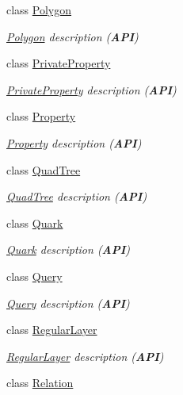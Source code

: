 \begin{DoxyCompactItemize}
class \hyperlink{classHurricane_1_1Polygon}{Polygon}
\begin{DoxyCompactList}\small\item\em \hyperlink{classHurricane_1_1Polygon}{Polygon} description ({\bfseries A\+PI}) \end{DoxyCompactList}\item 
class \hyperlink{classHurricane_1_1PrivateProperty}{Private\+Property}
\begin{DoxyCompactList}\small\item\em \hyperlink{classHurricane_1_1PrivateProperty}{Private\+Property} description ({\bfseries A\+PI}) \end{DoxyCompactList}\item 
class \hyperlink{classHurricane_1_1Property}{Property}
\begin{DoxyCompactList}\small\item\em \hyperlink{classHurricane_1_1Property}{Property} description ({\bfseries A\+PI}) \end{DoxyCompactList}\item 
class \hyperlink{classHurricane_1_1QuadTree}{Quad\+Tree}
\begin{DoxyCompactList}\small\item\em \hyperlink{classHurricane_1_1QuadTree}{Quad\+Tree} description ({\bfseries A\+PI}) \end{DoxyCompactList}\item 
class \hyperlink{classHurricane_1_1Quark}{Quark}
\begin{DoxyCompactList}\small\item\em \hyperlink{classHurricane_1_1Quark}{Quark} description ({\bfseries A\+PI}) \end{DoxyCompactList}\item 
class \hyperlink{classHurricane_1_1Query}{Query}
\begin{DoxyCompactList}\small\item\em \hyperlink{classHurricane_1_1Query}{Query} description ({\bfseries A\+PI}) \end{DoxyCompactList}\item 
class \hyperlink{classHurricane_1_1RegularLayer}{Regular\+Layer}
\begin{DoxyCompactList}\small\item\em \hyperlink{classHurricane_1_1RegularLayer}{Regular\+Layer} description ({\bfseries A\+PI}) \end{DoxyCompactList}\item 
class \hyperlink{classHurricane_1_1Relation}{Relation}

\end{DoxyCompactItemize}
